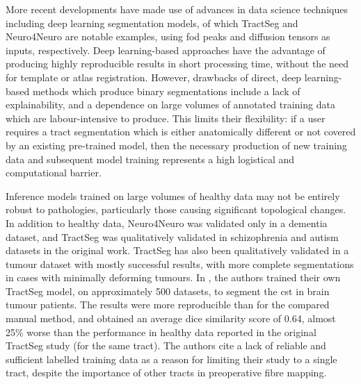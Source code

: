 More recent developments have made use of advances in data science techniques including deep learning segmentation models, of which TractSeg\autocite{Wasserthal2018} and Neuro4Neuro\autocite{Li2020} are notable examples, using \gls{fod} peaks and diffusion tensors as inputs, respectively.
Deep learning-based approaches have the advantage of producing highly reproducible results in short processing time, without the need for template or atlas registration.
However, drawbacks of direct, deep learning-based methods which produce binary segmentations include a lack of explainability, and a dependence on large volumes of annotated training data which are labour-intensive to produce.
This limits their flexibility: if a user requires a tract segmentation which is either anatomically different or not covered by an existing pre-trained model, then the necessary production of new training data and subsequent model training represents a high logistical and computational barrier.

Inference models trained on large volumes of healthy data may not be entirely robust to pathologies, particularly those causing significant topological changes.
In addition to healthy data, Neuro4Neuro\autocite{Li2020} was validated only in a dementia dataset, and TractSeg\autocite{Wasserthal2018} was qualitatively validated in schizophrenia and autism datasets in the original work.
TractSeg has also been qualitatively validated in a tumour dataset with mostly successful results, with more complete segmentations in cases with minimally deforming tumours.\autocite{Richards2021}
In \textcite{Moshe2022}, the authors trained their own TractSeg model, on approximately 500 datasets, to segment the \gls{cst} in brain tumour patients.
The results were more reproducible than for the compared manual method, and obtained an average dice similarity score of 0.64, almost 25\% worse than the performance in healthy data reported in the original TractSeg study (for the same tract).
The authors cite a lack of reliable and sufficient labelled training data as a reason for limiting their study to a single tract, despite the importance of other tracts in preoperative fibre mapping.
